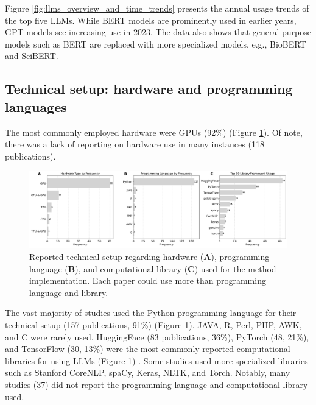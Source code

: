 \documentclass[fleqn,10pt]{olplainarticle}
\begin{document}
Figure \ref{fig:llms_overview_and_time_trends} presents the annual usage trends of the top five LLMs. While BERT models are prominently used in earlier years, GPT models see increasing use in 2023. The data also shows that general-purpose models such as BERT are replaced with more specialized models, e.g., BioBERT and SciBERT.


\subsection*{Technical setup: hardware and programming languages}
The most commonly employed hardware were GPUs (92\%) (Figure \ref{fig:technical_summary_2024}). Of note, there was a lack of reporting on hardware use in many instances (118 publications).

\begin{figure}[h]
\begin{center}
\includegraphics[scale=0.30]{visuals/new_pdf/technical_summary_2024.pdf} %
\caption{Reported technical setup regarding hardware (\textbf{A}), programming language (\textbf{B}), and computational library (\textbf{C}) used for the method implementation. Each paper could use more than programming language and library.}
\label{fig:technical_summary_2024}
\end{center}
\end{figure}

The vast majority of studies used the Python programming language for their technical setup (157 publications, 91\%) (Figure \ref{fig:technical_summary_2024}). JAVA, R, Perl, PHP, AWK, and C were rarely used. HuggingFace (83 publications, 36\%), PyTorch (48, 21\%), and TensorFlow (30, 13\%) were the most commonly reported computational libraries for using LLMs (Figure \ref{fig:technical_summary_2024}) . Some studies used more specialized libraries such as Stanford CoreNLP, spaCy, Keras, NLTK, and Torch. Notably, many studies (37) did not report the programming language and computational library used.

\end{document}
